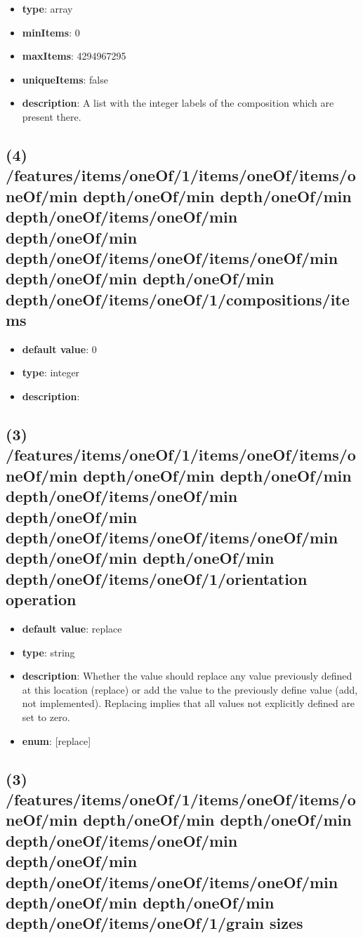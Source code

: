 \begin{itemize}[leftmargin=3em]\item {\bf type}: array
\item {\bf minItems}: 0
\item {\bf maxItems}: 4294967295
\item {\bf uniqueItems}: false
\item {\bf description}: A list with the integer labels of the composition which are present there.
\end{itemize}\subsection{(4) /features/items/oneOf/1/items/oneOf/items/oneOf/min depth/oneOf/min depth/oneOf/min depth/oneOf/items/oneOf/min depth/oneOf/min depth/oneOf/items/oneOf/items/oneOf/min depth/oneOf/min depth/oneOf/min depth/oneOf/items/oneOf/1/compositions/items}
\begin{itemize}[leftmargin=4em]\item {\bf default value}: 0
\item {\bf type}: integer
\item {\bf description}: 
\end{itemize}\subsection{(3) /features/items/oneOf/1/items/oneOf/items/oneOf/min depth/oneOf/min depth/oneOf/min depth/oneOf/items/oneOf/min depth/oneOf/min depth/oneOf/items/oneOf/items/oneOf/min depth/oneOf/min depth/oneOf/min depth/oneOf/items/oneOf/1/orientation operation}
\begin{itemize}[leftmargin=3em]\item {\bf default value}: replace
\item {\bf type}: string
\item {\bf description}: Whether the value should replace any value previously defined at this location (replace) or add the value to the previously define value (add, not implemented). Replacing implies that all values not explicitly defined are set to zero.
\item {\bf enum}: [replace]\end{itemize}\subsection{(3) /features/items/oneOf/1/items/oneOf/items/oneOf/min depth/oneOf/min depth/oneOf/min depth/oneOf/items/oneOf/min depth/oneOf/min depth/oneOf/items/oneOf/items/oneOf/min depth/oneOf/min depth/oneOf/min depth/oneOf/items/oneOf/1/grain sizes}

